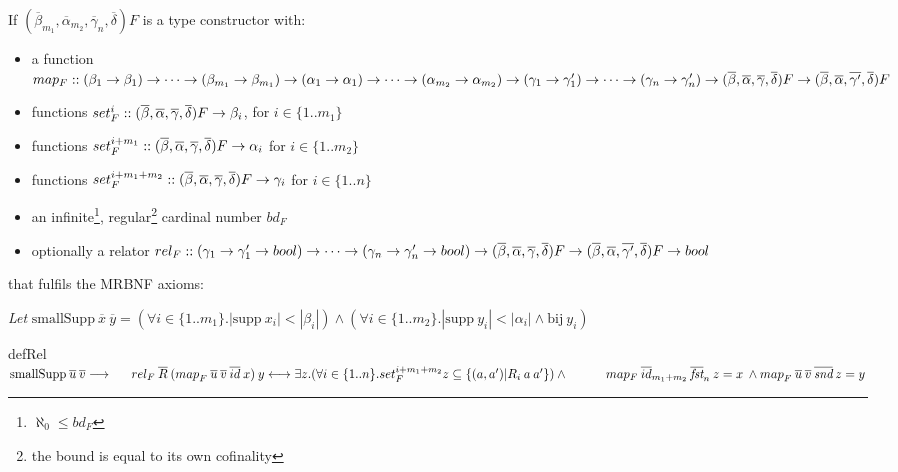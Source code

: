 \begin{definition}[\ac{MRBNF}]
If $(\overline{\beta}_{m_1}, \overline{\alpha}_{m_2}, \overline{\gamma}_n, \overline{\delta}) F$ is a type constructor with:
\begin{itemize}
\item{a function $map_F :: (\beta_1 \to \beta_1) \to \dots \to (\beta_{m_1} \to \beta_{m_1}) \to (\alpha_1 \to \alpha_1) \to \dots \to (\alpha_{m_2} \to \alpha_{m_2}) \to (\gamma_1 \to \gamma'_1) \to \dots \to (\gamma_n \to \gamma'_n) \to (\overline{\beta}, \overline{\alpha}, \overline{\gamma}, \overline{\delta}) F \to (\overline{\beta}, \overline{\alpha}, \overline{\gamma'}, \overline{\delta}) F$}
\item{functions $set_F^i :: (\overline{\beta}, \overline{\alpha}, \overline{\gamma}, \overline{\delta}) F \to \beta_i$, for $i \in \{1 .. m_1\}$}
\item{functions $set_F^{i+m_1} :: (\overline{\beta}, \overline{\alpha}, \overline{\gamma}, \overline{\delta}) F \to \alpha_i$ for $i \in \{1 .. m_2\}$}
\item{functions $set_F^{i+m_1+m_2} :: (\overline{\beta}, \overline{\alpha}, \overline{\gamma}, \overline{\delta}) F \to \gamma_i$ for $i \in \{1 .. n\}$}
\item{an infinite\footnote{$\aleph_0 \le bd_F$}, regular\footnote{the bound is equal to its own cofinality\label{ftn:regular}} cardinal number $bd_F$}
\item{optionally a relator $rel_F :: (\gamma_1 \to \gamma'_1 \to bool) \to \dots \to (\gamma_n \to \gamma'_n \to bool) \to (\overline{\beta}, \overline{\alpha}, \overline{\gamma}, \overline{\delta}) F \to (\overline{\beta}, \overline{\alpha}, \overline{\gamma'}, \overline{\delta}) F \to bool$}
\end{itemize}

that fulfils the \ac{MRBNF} axioms:
\vspace{1em}

\textit{Let} $\text{smallSupp} \: \overline{x} \: \overline{y} = (\forall i \in \{1..m_1\}. |\text{supp} \: x_i| < |\beta_i|) \wedge (\forall i \in \{1..m_2\}. |\text{supp} \: y_i| < |\alpha_i| \wedge \text{bij} \: y_i)$

\newcommand{\mapF}[3]{\map{F}{#1}{#2}{#3}}
\newcommand{\relF}[3]{rel_F \: \overline{#1} \: \overline{#2} \: \overline{#3}}

\begin{axiom}{defRel}\label{ax:def_rel}
$\smallSupp{u}{v} \longrightarrow \\
\ms rel_F \: \overline{R} \: (\map{F}{u}{v}{id} \: x) \: y \longleftrightarrow \exists z. (\forall i \in \{1..n\}. set_F^{i+m_1+m_2} z \subseteq \{(a, a') | R_i \: a \: a' \}) \wedge \\*
\ms \ms map_F \: \overline{id}_{m_1+m_2} \: \overline{\textit{fst}}_n \: z = x \: \wedge \mapF{u}{v}{\textit{snd}} \: z = y
$
\end{axiom}


\end{definition}
